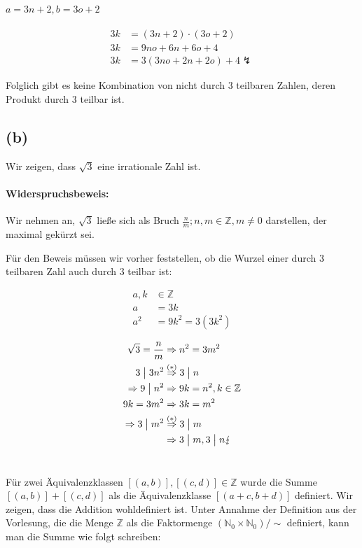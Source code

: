\documentclass[11pt,a4paper]{article}
\begin{document}
\paragraph{$a = 3n+2, b = 3o+2$}
\begin{align*}
    3k &= (3n+2) \cdot (3o+2)\\
    3k &= 9no + 6n + 6o + 4\\
    3k &= 3(3no + 2n + 2o) + 4 \lightning
\end{align*}

Folglich gibt es keine Kombination von nicht durch $3$ teilbaren Zahlen, deren Produkt durch $3$ teilbar ist. \checkmark

\subsection*{(b)}
Wir zeigen, dass $\sqrt{3}$ eine irrationale Zahl ist.

\paragraph{Widerspruchsbeweis:}
Wir nehmen an, $\sqrt{3}$ ließe sich als Bruch $\frac{n}{m}; n, m \in \mathbb{Z}, m \neq 0$ darstellen, der maximal gekürzt sei.

Für den Beweis müssen wir vorher feststellen, ob die Wurzel einer durch $3$ teilbaren Zahl auch durch $3$ teilbar ist:

\begin{align*}
a, k &\in \mathbb{Z}\\
a &= 3k\\
a^2 &= 9k^2 = 3(3k^2) \tag*{\checkmark $(\ast)$}
\end{align*}

\begin{align*}
\sqrt{3} = \frac{n}{m} &\Rightarrow n^2 = 3m^2\\
3 \bigm| 3n^2 &\stackrel{(\ast)}{\Rightarrow} 3 \bigm| n\\
\Rightarrow 9 \bigm| n^2 &\Rightarrow 9k = n^2, k \in \mathbb{Z}\\
9k = 3m^2 &\Rightarrow 3k = m^2\\
\Rightarrow 3 \bigm| m^2 &\stackrel{(\ast)}{\Rightarrow} 3 \bigm| m\\
&\Rightarrow 3 \bigm| m, 3 \bigm| n \lightning
\end{align*}

\section{} %
Für zwei Äquivalenzklassen $[(a,b)], [(c,d)] \in \mathbb{Z}$ wurde die Summe $[(a,b)] + [(c,d)]$ als die Äquivalenzklasse $[(a+c,b+d)]$ definiert. Wir zeigen, dass die Addition wohldefiniert ist.
Unter Annahme der Definition aus der Vorlesung, die die Menge $\mathbb{Z}$ als die Faktormenge $(\mathbb{N}_0 \times \mathbb{N}_0) / \sim$ definiert, kann man die Summe wie folgt schreiben:
\end{document}
